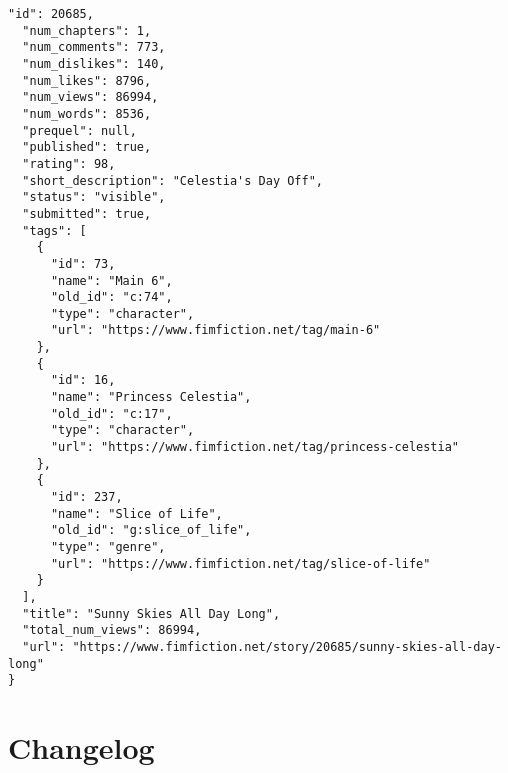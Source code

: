 \documentclass[hidelinks,a4paper,12pt]{article}
\begin{document}
\begin{lstlisting}[breaklines, basicstyle=\ttfamily\small, columns=flexible]
  "id": 20685,
  "num_chapters": 1,
  "num_comments": 773,
  "num_dislikes": 140,
  "num_likes": 8796,
  "num_views": 86994,
  "num_words": 8536,
  "prequel": null,
  "published": true,
  "rating": 98,
  "short_description": "Celestia's Day Off",
  "status": "visible",
  "submitted": true,
  "tags": [
    {
      "id": 73,
      "name": "Main 6",
      "old_id": "c:74",
      "type": "character",
      "url": "https://www.fimfiction.net/tag/main-6"
    },
    {
      "id": 16,
      "name": "Princess Celestia",
      "old_id": "c:17",
      "type": "character",
      "url": "https://www.fimfiction.net/tag/princess-celestia"
    },
    {
      "id": 237,
      "name": "Slice of Life",
      "old_id": "g:slice_of_life",
      "type": "genre",
      "url": "https://www.fimfiction.net/tag/slice-of-life"
    }
  ],
  "title": "Sunny Skies All Day Long",
  "total_num_views": 86994,
  "url": "https://www.fimfiction.net/story/20685/sunny-skies-all-day-long"
}
\end{lstlisting}


\section{Changelog} \label{sec:changelog}
\end{document}
